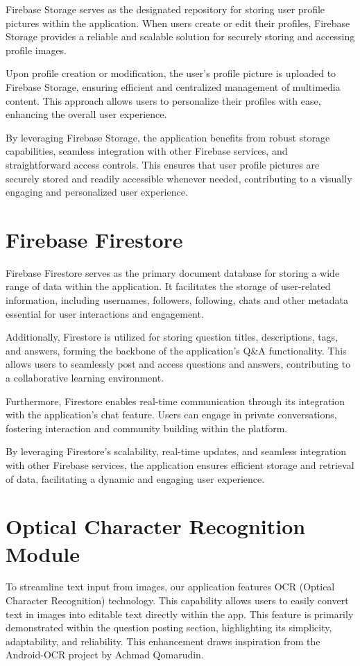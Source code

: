 Firebase Storage serves as the designated repository for storing user profile pictures within the application. When users create or edit their profiles, Firebase Storage provides a reliable and scalable solution for securely storing and accessing profile images.

Upon profile creation or modification, the user's profile picture is uploaded to Firebase Storage, ensuring efficient and centralized management of multimedia content. This approach allows users to personalize their profiles with ease, enhancing the overall user experience.

By leveraging Firebase Storage, the application benefits from robust storage capabilities, seamless integration with other Firebase services, and straightforward access controls. This ensures that user profile pictures are securely stored and readily accessible whenever needed, contributing to a visually engaging and personalized user experience.

\section{Firebase Firestore}

Firebase Firestore serves as the primary document database for storing a wide range of data within the application. It facilitates the storage of user-related information, including usernames, followers, following, chats and other metadata essential for user interactions and engagement.

Additionally, Firestore is utilized for storing question titles, descriptions, tags, and answers, forming the backbone of the application's Q\&A functionality. This allows users to seamlessly post and access questions and answers, contributing to a collaborative learning environment.

Furthermore, Firestore enables real-time communication through its integration with the application's chat feature. Users can engage in private conversations, fostering interaction and community building within the platform.

By leveraging Firestore's scalability, real-time updates, and seamless integration with other Firebase services, the application ensures efficient storage and retrieval of data, facilitating a dynamic and engaging user experience.


\section{Optical Character Recognition Module}
To streamline text input from images, our application features OCR (Optical Character Recognition) technology. This capability allows users to easily convert text in images into editable text directly within the app. This feature is primarily demonstrated within the question posting section, highlighting its simplicity, adaptability, and reliability. This enhancement draws inspiration from the Android-OCR project by Achmad Qomarudin.

